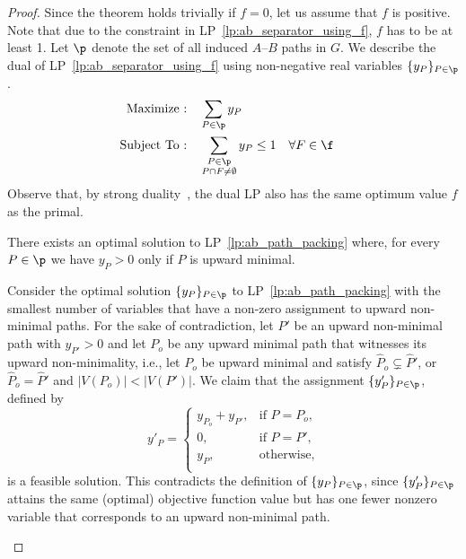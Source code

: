 \begin{proof}
    Since the theorem holds trivially if $f = 0$, let us assume that $f$ is positive. Note that due to the constraint in LP~\ref{lp:ab_separator_using_f}, $f$ has to be at least 1. Let $\p$ denote the set of all induced $A$--$B$ paths in $G$. We describe the dual of LP~\ref{lp:ab_separator_using_f} using non-negative real variables $\{y_P\}_{P\in\p}$. 
    \begin{align}\label{lp:ab_path_packing}
        \text{Maximize :}&\quad \sum\limits_{P\in\p} y_{P}\\
        \nonumber \text{Subject To :}&\quad \sum\limits_{\substack{P\in \p\\ P\cap F\neq \emptyset}} y_{P} \leq 1 && \forall F\in \f
    \end{align}
    Observe that, by strong duality~\cite{doi:10.1137/1025101}, the dual LP also has the same optimum value $f$ as the primal. 
    
    \begin{claim}
        There exists an optimal solution to LP~\ref{lp:ab_path_packing} where, for every $P\in\p$ we have $y_P > 0$ only if $P$ is upward minimal.
    \end{claim}
    \begin{claimproof}
        Consider the optimal solution $\{y_P\}_{P\in\p}$ to LP~\ref{lp:ab_path_packing} with the smallest number of variables that have a non-zero assignment to upward non-minimal paths. For the sake of contradiction, let $P'$ be an upward non-minimal path with $y_{P'} > 0$ and let $P_o$ be any upward minimal path that witnesses its upward non-minimality, i.e., let $P_o$ be upward minimal and satisfy $\widehat{P}_o \subsetneq \widehat{P}'$, or $\widehat{P}_o = \widehat{P}'$ and $|V(P_o)| < |V(P')|$. %
        We claim that the assignment $\{y'_P\}_{P \in \p}$, defined by
        $$
        y'_P = 
        \begin{cases}
        y_{P_o} + y_{P'}, & \text{if } P = P_o, \\
        0, & \text{if } P = P',\\
        y_P, & \text{otherwise}, \\
        \end{cases}
        $$
        is a feasible solution. This contradicts the definition of $\{y_P\}_{P \in \p}$, since $\{y'_P\}_{P \in \p}$ attains the same (optimal) objective function value but has one fewer nonzero variable that corresponds to an upward non-minimal path.


\end{claimproof}
\end{proof}
